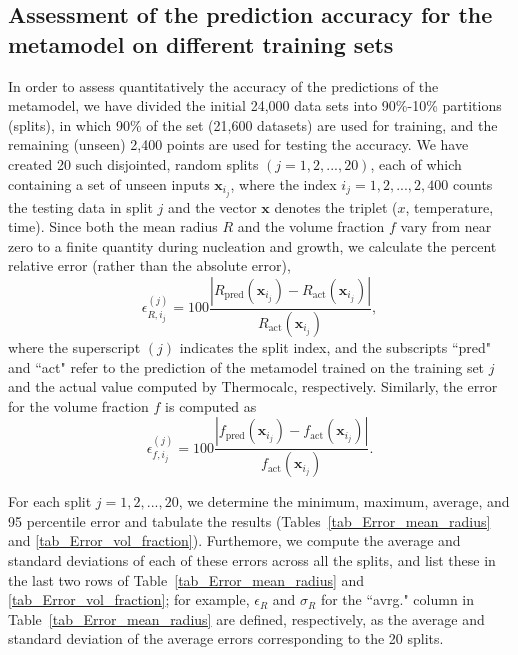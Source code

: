 \subsection{Assessment of the prediction accuracy for the metamodel on different training sets}\label{subsec_test_meta}


In order to assess quantitatively the accuracy of the predictions of the metamodel, we have divided the initial 24,000 data sets into 90\%-10\% partitions (splits),
in which 90\% of the set (21,600 datasets) are used for training, and the remaining (unseen) 2,400 points are used for testing the accuracy.
We have created 20 such disjointed, random splits $(j=1,2,...,20)$, each of which containing a set of unseen inputs
${\textbf{x}_{i_j}}$, where the index $i_j=1,2,..., 2,400$ counts the testing data in split $j$ and the vector $\textbf{x}$ denotes the triplet ($x$, temperature, time).
Since both the mean radius $R$ and the volume fraction $f$ vary from near zero to a finite quantity during nucleation and
growth, we calculate the percent relative error (rather than the absolute error),
\begin{equation}
\epsilon ^{(j)} _{R,i_j} = 100\frac{|R_{\text {pred}} (\textbf{x}_{i_j}) - R_{\text {act}} (\textbf{x}_{i_j})|}{R_{\text {act}} (\textbf{x}_{i_j})},
\end{equation}
where the superscript $(j)$ indicates the split index, and the subscripts ``pred" and ``act" refer to the prediction
of the metamodel trained on the training set $j$ and the actual value computed by Thermocalc, respectively.
Similarly, the error for the volume fraction $f$ is computed as
\begin{equation}
\epsilon ^{(j)} _{f,i_j} = 100\frac{|f_{\text {pred}} (\textbf{x}_{i_j}) - f_{\text {act}} (\textbf{x}_{i_j})|}{f_{\text {act}} (\textbf{x}_{i_j})}. \label{eq:fij}
\end{equation}

For each split $j=1,2,..., 20$, we determine the minimum, maximum, average, and 95 percentile error and tabulate the results (Tables~\ref{tab_Error_mean_radius} and \ref{tab_Error_vol_fraction}). Furthemore, we compute the average and standard deviations of each of
these errors across  all the splits, and list these in the last two rows of Table~\ref{tab_Error_mean_radius} and \ref{tab_Error_vol_fraction};
for example, $\epsilon_R$ and $\sigma_R$ for the ``avrg." column in Table~\ref{tab_Error_mean_radius} are defined, respectively,
as the average and standard deviation of the average errors corresponding to the 20 splits.

